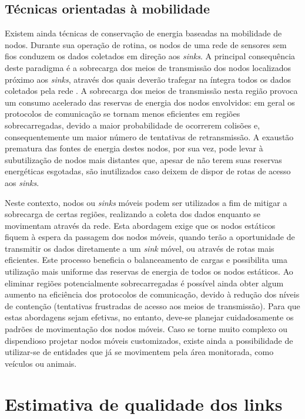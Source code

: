 \documentclass[
	12pt,				%
	openright,			%
	oneside,
	a4paper,			%
	english,			%
	french,				%
	spanish,			%
	brazil				%
	]{abntex2}
\begin{document}
\subsection{Técnicas orientadas à mobilidade}

Existem ainda técnicas de conservação de energia baseadas na mobilidade de nodos. Durante sua operação de rotina, os nodos de uma rede de sensores sem fios conduzem os dados coletados em direção aos \textit{sinks}. A principal consequência deste paradigma é a sobrecarga dos meios de transmissão dos nodos localizados próximo aos \textit{sinks}, através dos quais deverão trafegar na íntegra todos os dados coletados pela rede \cite{Li2007}. A sobrecarga dos meios de transmissão nesta região provoca um consumo acelerado das reservas de energia dos nodos envolvidos: em geral os protocolos de comunicação se tornam menos eficientes em regiões sobrecarregadas, devido a maior probabilidade de ocorrerem colisões e, consequentemente um maior número de tentativas de retransmissão. A exaustão prematura das fontes de energia destes nodos, por sua vez, pode levar à subutilização de nodos mais distantes que, apesar de não terem suas reservas energéticas esgotadas, são inutilizados caso deixem de dispor de rotas de acesso aos \textit{sinks}.

Neste contexto, nodos ou \textit{sinks} móveis podem ser utilizados a fim de mitigar a sobrecarga de certas regiões, realizando a coleta dos dados enquanto se movimentam através da rede. Esta abordagem exige que os nodos estáticos fiquem à espera da passagem dos nodos móveis, quando terão a oportunidade de transmitir os dados diretamente a um \textit{sink} móvel, ou através de rotas mais eficientes. Este processo beneficia o balanceamento de cargas e possibilita uma utilização mais uniforme das reservas de energia de todos os nodos estáticos. Ao eliminar regiões potencialmente sobrecarregadas é possível ainda obter algum aumento na eficiência dos protocolos de comunicação, devido à redução dos níveis de contenção (tentativas frustradas de acesso aos meios de transmissão). Para que estas abordagens sejam efetivas, no entanto, deve-se planejar cuidadosamente os padrões de movimentação dos nodos móveis. Caso se torne muito complexo ou dispendioso projetar nodos móveis customizados, existe ainda a possibilidade de utilizar-se de entidades que já se movimentem pela área monitorada, como veículos ou animais.

\section{Estimativa de qualidade  dos links}
\end{document}
